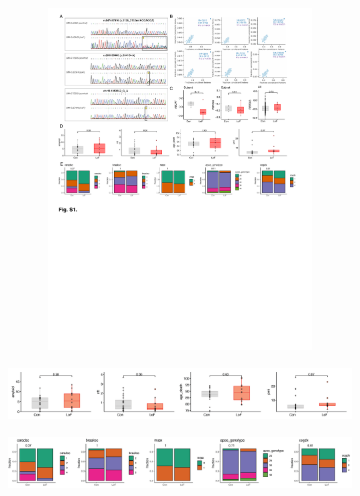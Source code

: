 \begin{figure}[ht]
\begin{subfigure}[t]{.5\textwidth}
        \begin{subfigure}[t]{\textwidth}
            \caption{}
            \includegraphics[width=\textwidth]{./extended_plots/protein_levels_extended.pdf}        
        \end{subfigure}  
    \end{subfigure}  
    \begin{subfigure}[t]{\textwidth}
        \caption{}
        \includegraphics[width=\textwidth]{./extended_plots/batch_cont_var.png}        
    \end{subfigure}  
    \begin{subfigure}[t]{\textwidth}
        \caption{}
        \includegraphics[width=\textwidth]{./extended_plots/batch_categorical_vars.png}        

\end{subfigure}
\end{figure}
